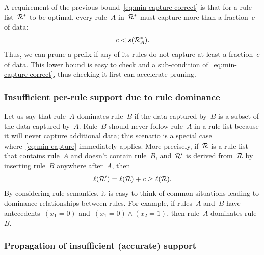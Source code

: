 A requirement of the previous bound~\eqref{eq:min-capture-correct}
is that for a rule list~${\mathcal R}^*$ to be optimal, every rule~$A$ in~${\mathcal R}^*$ must
capture more than a fraction~$c$ of data:
\begin{align}
c < s(\RL_A^*).
\label{eq:min-capture}
\end{align}
Thus, we can prune a prefix if any of its rules do not capture at least
a fraction~$c$ of data.
%
This lower bound is easy to check and a sub-condition of~\eqref{eq:min-capture-correct},
thus checking it first can accelerate pruning.

\subsubsection{Insufficient per-rule support due to rule dominance}

Let us say that rule~$A$ dominates rule~$B$ if the data captured by~$B$ is a subset of the data captured by~$A$.
%
Rule~$B$ should never follow rule~$A$ in a rule list because it will never capture additional data;
this scenario is a special case where~\eqref{eq:min-capture} immediately applies.
%
More precisely, if~${\mathcal R}$ is a rule list that contains rule~$A$ and doesn't contain rule~$B$,
and~${\mathcal R}'$ is derived from~${\mathcal R}$ by inserting rule~$B$ anywhere after~$A$, then
\begin{align}
\ell(\RL') = \ell(\RL) + c \ge \ell(\RL).
\end{align}
By considering rule semantics, it is easy to think of common situations
leading to dominance relationships between rules.
%
For example, if rules~$A$ and~$B$ have antecedents~${(x_1 = 0)}$
and~${(x_1 = 0) \wedge (x_2 = 1)}$, then rule~$A$ dominates rule~$B$.
%

\subsubsection{Propagation of insufficient (accurate) support}

